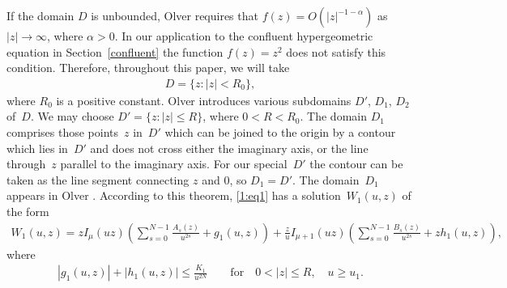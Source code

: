 \documentclass[11pt]{article}
\numberwithin{equation}{section}
\begin{document}
If the domain $D$ is unbounded, Olver \cite[p.~77]{O} requires that $f(z)=O(|z|^{-1-\alpha})$ as $|z|\to\infty$, where $\alpha>0$.
In our application to the conf\/luent hypergeometric equation in Section~\ref{confluent} the function $f(z)=z^2$ does not satisfy this condition.
Therefore, throughout this paper, we will take
\begin{gather}\label{1:D}
 D=\{z\colon |z|<R_0\},
 \end{gather}
where $R_0$ is a positive constant.
Olver \cite[p.~77]{O} introduces various subdomains $D'$, $D_1$, $D_2$ of~$D$.
We may choose $D'=\{z\colon |z|\le R\}$, where $0<R<R_0$. The domain $D_1$ comprises those points~$z$ in~$D'$ which can be joined to the origin by a contour
which lies in~$D'$ and does not cross either the imaginary axis, or the line through~$z$ parallel to the imaginary axis.
For our special~$D'$ the contour can be taken as the line segment connecting $z$ and $0$, so $D_1=D'$. The domain~$D_1$ appears in
Olver \cite[Theorem~D(i)]{O}. According to this theorem, \eqref{1:eq1} has a solu\-tion~$W_1(u,z)$ of the form
\begin{gather}\label{1:W1}
W_1(u,z)=zI_\mu(uz)\left(\sum_{s=0}^{N-1} \frac{A_s(z)}{u^{2s}}+g_1(u,z)\right)
+\frac{z}{u}I_{\mu+1}(uz)\left(\sum_{s=0}^{N-1} \frac{B_s(z)}{u^{2s}}+zh_1(u,z)\right),\!\!\!
\end{gather}
where
\begin{gather}\label{1:W1a}
 |g_1(u,z)|+|h_1(u,z)|\le \frac{K_1}{u^{2N}}\qquad \text{for} \quad 0<|z|\le R,\quad u\ge u_1 .
\end{gather}
\end{document}
